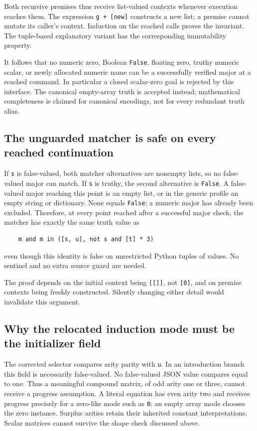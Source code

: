 \documentclass[11pt,letterpaper]{article}
\theoremstyle{definition}\newtheorem{definition}[theorem]{Definition}
\theoremstyle{remark}\newtheorem{remark}[theorem]{Remark}
\begin{document}
Both recursive premises thus receive list-valued contexts whenever
execution reaches them.  The expression \texttt{g + [new]} constructs a
new list; a premise cannot mutate its caller's context.  Induction on
the reached calls proves the invariant.  The tuple-based explanatory
variant has the corresponding immutability property.

It follows that no numeric zero, Boolean \texttt{False}, floating zero,
truthy numeric scalar, or newly allocated numeric name can be a
successfully verified major at a reached command.  In particular a
closed scalar-zero goal is rejected by this interface.  The canonical
empty-array truth is accepted instead; mathematical completeness is
claimed for canonical encodings, not for every redundant truth alias.

\subsection{The unguarded matcher is safe on every reached continuation}

If \texttt{s} is false-valued, both matcher alternatives are nonempty
lists, so no false-valued major can match.  If \texttt{s} is truthy, the
second alternative is \texttt{False}.  A false-valued major reaching
this point is an empty list, or in the generic profile an empty string
or dictionary.  None equals \texttt{False}; a numeric major has already
been excluded.  Therefore, at every point reached after a successful
major check, the matcher has exactly the same truth value as
\begin{verbatim}
    m and m in ([s, u], not s and [t] * 3)
\end{verbatim}
even though this identity is false on unrestricted Python tuples of
values.  No sentinel and no extra source guard are needed.

The proof depends on the initial context being \texttt{[[]]}, not
\texttt{[0]}, and on premise contexts being freshly constructed.
Silently changing either detail would invalidate this argument.

\subsection{Why the relocated induction mode must be the initializer field}

The corrected selector compares arity parity with \texttt{u}.  In an
introduction branch this field is necessarily false-valued.  No
false-valued JSON value compares equal to one.  Thus a meaningful
compound matrix, of odd arity one or three, cannot receive a progress
assumption.  A literal equation has even arity two and receives
progress precisely for a zero-like mode such as \texttt{0}; an empty
array mode chooses the zero instance.  Surplus arities retain their
inherited constant interpretations.  Scalar matrices cannot survive
the shape check discussed above.
\end{document}

